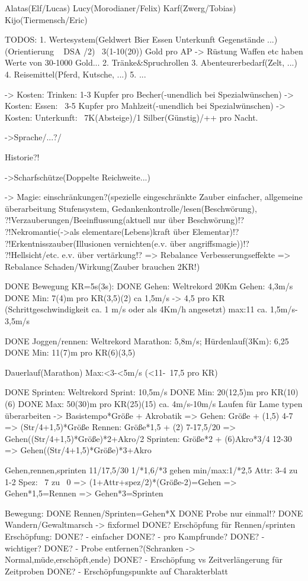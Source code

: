 Alatas(Elf/Lucas)
Lucy(Morodianer/Felix)
Karf(Zwerg/Tobias)
Kijo(Tiermensch/Eric)

TODOS:
1. Wertesystem(Geldwert Bier Essen Unterkunft Gegenstände ...)(Orientierung ~ DSA /2) ~3(1-10(20)) Gold pro AP -> Rüstung Waffen etc haben Werte von 30-1000 Gold...
2. Tränke&Spruchrollen
3. Abenteurerbedarf(Zelt, ...)
4. Reisemittel(Pferd, Kutsche, ...)
5. ...

-> Kosten: Trinken: 1-3 Kupfer pro Becher(-unendlich bei Spezialwünschen)
-> Kosten: Essen: ~3-5 Kupfer pro Mahlzeit(-unendlich bei Spezialwünschen)
-> Kosten: Unterkunft: ~7K(Absteige)/1 Silber(Günstig)/++ pro Nacht.

->Sprache/...?/

Historie?!

->Scharfschütze(Doppelte Reichweite...)

-> Magie: 
	einschränkungen?(spezielle eingeschränkte Zauber einfacher, 
	allgemeine überarbeitung Stufensystem,
	 Gedankenkontrolle/lesen(Beschwörung), 
	 ?!Verzauberungen/Beeinflussung(aktuell nur über Beschwörung)!?
	 ?!Nekromantie(->als elementare(Lebens)kraft über Elementar)!?
	 ?!Erkentnisszauber(Illusionen vernichten(e.v. über angriffsmagie))!?
	 ?!Hellsicht/etc. e.v. über vertärkung!?
	=> Rebalance Verbesserungseffekte
	=> Rebalance Schaden/Wirkung(Zauber brauchen 2KR!)

DONE Bewegung KR=5s(3s):
DONE 	Gehen: Weltrekord 20Km Gehen: 4,3m/s
DONE 	Min: 7(4)m pro KR(3,5)(2)
		ca 1,5m/s -> 4,5 pro KR
		(Schrittgeschwindigkeit ca. 1 m/s oder als 4Km/h angesetzt)
		max:11
		ca. 1,5m/s-3,5m/s

DONE 	Joggen/rennen: Weltrekord Marathon: 5,8m/s; Hürdenlauf(3Km): 6,25
DONE 	Min: 11(7)m pro KR(6)(3,5)
		
		Dauerlauf(Marathon)
		Max:<3-<5m/s (<11-~17,5 pro KR)

DONE 	Sprinten: Weltrekord Sprint: 10,5m/s
DONE 	Min: 20(12,5)m pro KR(10)(6)
DONE 	Max: 50(30)m pro KR(25)(15)
		ca. 4m/s-10m/s
Laufen für Lame typen überarbeiten
	-> Basistempo*Größe + Akrobatik
		=> 	Gehen: Größe + (1,5)
					4-7
					=> (Str/4+1,5)*Größe
			Rennen: Größe*1,5 + (2)
					7-17,5/20
					=> Gehen((Str/4+1,5)*Größe)*2+Akro/2
			Sprinten: Größe*2 + (6)Akro*3/4
					12-30
					=> Gehen((Str/4+1,5)*Größe)*3+Akro

Gehen,rennen,sprinten
11/17,5/30
1/*1,6/*3
gehen min/max:1/*2,5
Attr: 3-4 zu 1-2
Spez: ~7 zu ~0
=> (1+Attr+spez/2)*(Größe-2)=Gehen
=> Gehen*1,5=Rennen
=> Gehen*3=Sprinten

Bewegung:
DONE	Rennen/Sprinten=Gehen*X
DONE	Probe nur einmal!?
DONE	Wandern/Gewaltmarsch -> fixformel
DONE?	Erschöpfung für Rennen/sprinten
Erschöpfung:
DONE?	- einfacher
DONE?	- pro Kampfrunde?
DONE?	- wichtiger?
DONE?	- Probe entfernen?(Schranken -> Normal,müde,erschöpft,ende)
DONE?	- Erschöpfung vs Zeitverlängerung für Zeitproben
DONE?	- Erschöpfungspunkte auf Charakterblatt


